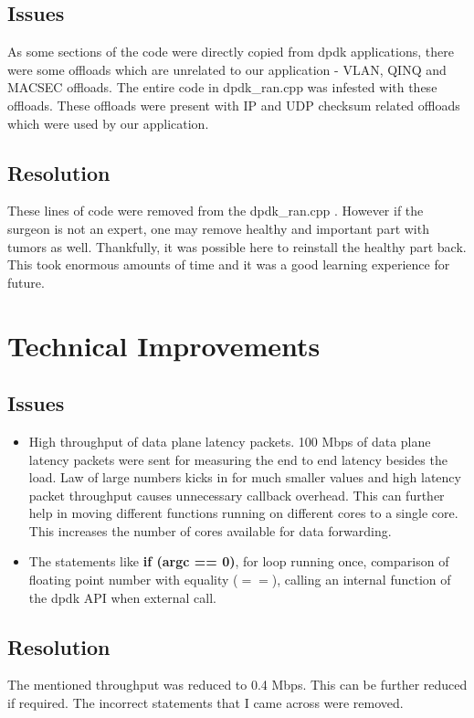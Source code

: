\subsection{Issues}
As some sections of the code were directly copied from dpdk applications, there were 
some offloads which are unrelated to our application - VLAN, QINQ and MACSEC offloads.
The entire code in dpdk\_ran.cpp was infested with these offloads. These offloads were present with IP
and UDP checksum related offloads which were used by our application.
\subsection{Resolution}
These lines of code were removed from the dpdk\_ran.cpp . However if the surgeon is not an expert,
one may remove healthy and important part with tumors as well. Thankfully, it was possible here 
to reinstall the healthy part back. This took enormous amounts of time and it was a good learning experience
for future.

\section{Technical Improvements}
\subsection{Issues}
\begin{itemize}
	\item High throughput of data plane latency packets. 100 Mbps of data plane latency packets were sent for measuring the 
	end to end latency besides the load. Law of large numbers kicks in for much smaller values and high latency packet throughput 
	causes unnecessary callback overhead. This can further help in moving different functions running on different cores to a single core. 
	This increases the number of cores available for data forwarding.
	\item The statements like \textbf{if (argc == 0)}, for loop running once, comparison of floating point number with equality ($==$), calling an internal function of the
	dpdk API when external call. 
\end{itemize}

\subsection{Resolution}
The mentioned throughput was reduced to 0.4 Mbps. This can be further reduced if required.
The incorrect statements that I came across were removed.
